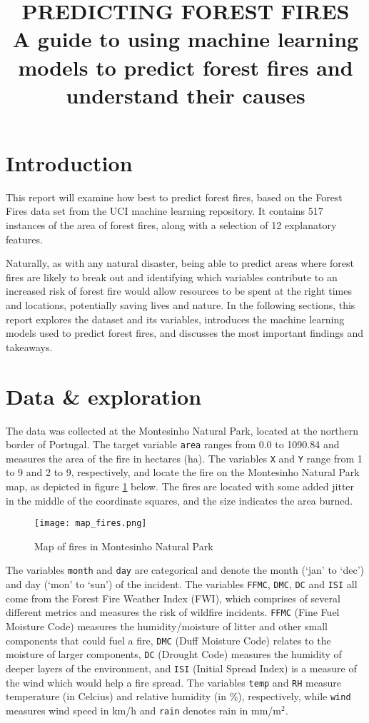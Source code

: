 \documentclass{article}
\title{PREDICTING FOREST FIRES \\ 
A guide to using machine learning models to predict forest fires and understand their causes}
\author{}
\date{}
\begin{document}
\maketitle

\section{Introduction}

This report will examine how best to predict forest fires, based on the Forest Fires data set from the UCI machine learning repository. It contains 517 instances of the area of forest fires, along with a selection of 12 explanatory features.

Naturally, as with any natural disaster, being able to predict areas where forest fires are likely to break out and identifying which variables contribute to an increased risk of forest fire would allow resources to be spent at the right times and locations, potentially saving lives and nature. In the following sections, this report explores the dataset and its variables, introduces the machine learning models used to predict forest fires, and discusses the most important findings and takeaways.

\section{Data \& exploration}

The data was collected at the Montesinho Natural Park, located at the northern border of Portugal. The target variable \texttt{area} ranges from 0.0 to 1090.84 and measures the area of the fire in hectares (ha). The variables \texttt{X} and \texttt{Y} range from 1 to 9 and 2 to 9, respectively, and locate the fire on the Montesinho Natural Park map, as depicted in figure \ref{fig:map_fires} below. The fires are located with some added jitter in the middle of the coordinate squares, and the size indicates the area burned.

\begin{figure}[!htbp]
    \centering
    \texttt{[image: map\_fires.png]}
    \caption{Map of fires in Montesinho Natural Park}
    \label{fig:map_fires}
\end{figure}

The variables \texttt{month} and \texttt{day} are categorical and denote the month (`jan' to `dec') and day (`mon' to `sun') of the incident.
The variables \texttt{FFMC}, \texttt{DMC}, \texttt{DC} and \texttt{ISI} all come from the Forest Fire Weather Index (FWI), which comprises of several different metrics and measures the risk of wildfire incidents. \texttt{FFMC} (Fine Fuel Moisture Code) measures the humidity/moisture of litter and other small components that could fuel a fire, \texttt{DMC} (Duff Moisture Code) relates to the moisture of larger components, \texttt{DC} (Drought Code) measures the humidity of deeper layers of the environment, and \texttt{ISI} (Initial Spread Index) is a measure of the wind which would help a fire spread.
The variables \texttt{temp} and \texttt{RH} measure temperature (in Celcius) and relative humidity (in \%), respectively, while \texttt{wind} measures wind speed in km/h and \texttt{rain} denotes rain in mm/m$^2$.
\end{document}
